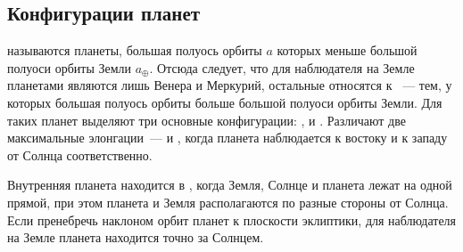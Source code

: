 \subsection{Конфигурации планет}
 называются планеты, большая полуось орбиты $a$ которых меньше большой полуоси орбиты Земли $a_\oplus$. Отсюда следует, что для наблюдателя на Земле  планетами являются лишь Венера и Меркурий, остальные относятся к ~--- тем, у которых большая полуось орбиты больше большой полуоси орбиты Земли. Для таких планет выделяют три основные конфигурации: ,  и . Различают две максимальные элонгации~---  и , когда планета наблюдается к востоку и к западу от Солнца соответственно.

Внутренняя планета находится в , когда Земля, Солнце и планета лежат на одной прямой, при этом планета и Земля располагаются по разные стороны от Солнца. Если пренебречь наклоном орбит планет к плоскости эклиптики, для наблюдателя на Земле планета находится точно за Солнцем.


